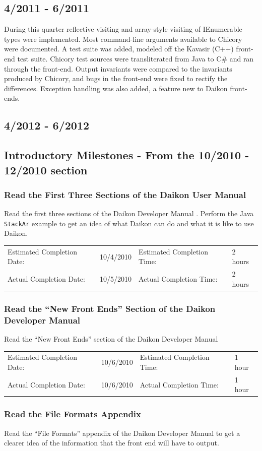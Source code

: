 \documentclass{article}
\newcommand{\timetbl}[4]{\par\vspace{5mm}\begin{tabular}{ l l l l }
Estimated Completion Date: & #1 & Estimated Completion Time: & #2 \\
Actual Completion Date: & #3 & Actual Completion Time: & #4 \\
\end{tabular}}
\begin{document}
\subsection{4/2011 - 6/2011}
During this quarter reflective visiting and array-style visiting of IEnumerable types were implemented. Most command-line arguments available to Chicory were documented. A test suite was added, modeled off the Kavasir (C++) front-end test suite. Chicory test sources were transliterated from Java to C\# and ran through the front-end. Output invariants were compared to the invariants produced by Chicory, and bugs in the front-end were fixed to rectify the differences. Exception handling was also added, a feature new to Daikon front-ends.

\subsection{4/2012 - 6/2012}

\subsection{Introductory Milestones - From the 10/2010 - 12/2010 section}

\subsubsection{Read the First Three Sections of the Daikon User Manual}
Read the first three sections of the Daikon Developer Manual \cite{DaikonUserManual:Online}. Perform the Java \verb|StackAr| example to get an idea of what Daikon can do and what it is like to use Daikon.

\timetbl{10/4/2010}{2 hours}{10/5/2010}{2 hours}

\subsubsection{Read the ``New Front Ends'' Section of the Daikon Developer Manual}
Read the ``New Front Ends'' section of the Daikon Developer Manual \cite{DaikonDeveloperManual:Online}

\timetbl{10/6/2010}{1 hour}{10/6/2010}{1 hour}

\subsubsection{Read the File Formats Appendix}
Read the ``File Formats'' appendix of the Daikon Developer Manual to get a clearer idea of the information that the front end will have to output.
\end{document}
